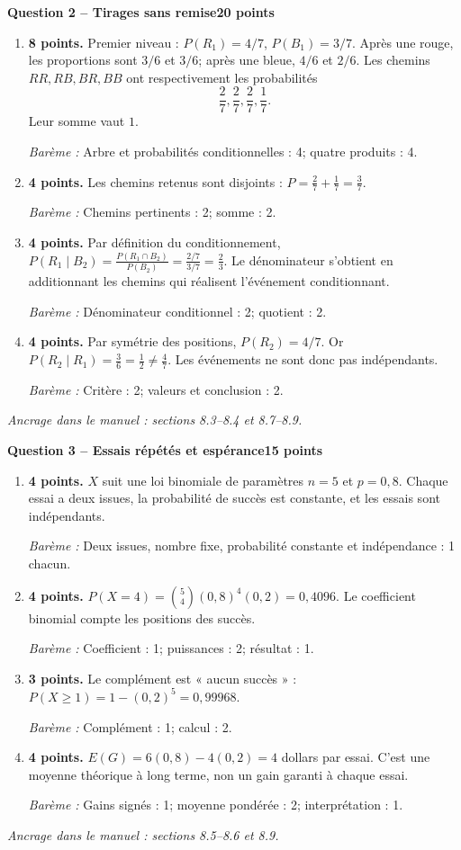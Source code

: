 \documentclass[11pt,a4paper]{article}
\begin{document}
\newpage
{\large\bfseries Question 2 -- Tirages sans remise}\hfill\textbf{20 points}\par
\begin{enumerate}
\item \textbf{8 points.} Premier niveau : \(P(R_1)=4/7\), \(P(B_1)=3/7\). Après une rouge, les proportions sont \(3/6\) et \(3/6\); après une bleue, \(4/6\) et \(2/6\). Les chemins \(RR,RB,BR,BB\) ont respectivement les probabilités \[\frac27,\frac27,\frac27,\frac17.\] Leur somme vaut \(1\).
\par{\small\textit{Barème : }Arbre et probabilités conditionnelles : 4; quatre produits : 4.}
\item \textbf{4 points.} Les chemins retenus sont disjoints : \(P=\frac27+\frac17=\frac37\).
\par{\small\textit{Barème : }Chemins pertinents : 2; somme : 2.}
\item \textbf{4 points.} Par définition du conditionnement, \(P(R_1\mid B_2)=\frac{P(R_1\cap B_2)}{P(B_2)}=\frac{2/7}{3/7}=\frac23\). Le dénominateur s’obtient en additionnant les chemins qui réalisent l’événement conditionnant.
\par{\small\textit{Barème : }Dénominateur conditionnel : 2; quotient : 2.}
\item \textbf{4 points.} Par symétrie des positions, \(P(R_2)=4/7\). Or \(P(R_2\mid R_1)=\frac36=\frac12\ne\frac47\). Les événements ne sont donc pas indépendants.
\par{\small\textit{Barème : }Critère : 2; valeurs et conclusion : 2.}
\end{enumerate}
\vfill {\small\textit{Ancrage dans le manuel : sections 8.3--8.4 et 8.7--8.9.}}

\newpage
{\large\bfseries Question 3 -- Essais répétés et espérance}\hfill\textbf{15 points}\par
\begin{enumerate}
\item \textbf{4 points.} \(X\) suit une loi binomiale de paramètres \(n=5\) et \(p=0{,}8\). Chaque essai a deux issues, la probabilité de succès est constante, et les essais sont indépendants.
\par{\small\textit{Barème : }Deux issues, nombre fixe, probabilité constante et indépendance : 1 chacun.}
\item \textbf{4 points.} \(P(X=4)=\binom54(0{,}8)^4(0{,}2)=0{,}4096\). Le coefficient binomial compte les positions des succès.
\par{\small\textit{Barème : }Coefficient : 1; puissances : 2; résultat : 1.}
\item \textbf{3 points.} Le complément est « aucun succès » : \(P(X\ge1)=1-(0{,}2)^5=0{,}99968\).
\par{\small\textit{Barème : }Complément : 1; calcul : 2.}
\item \textbf{4 points.} \(E(G)=6(0{,}8)-4(0{,}2)=4\) dollars par essai. C’est une moyenne théorique à long terme, non un gain garanti à chaque essai.
\par{\small\textit{Barème : }Gains signés : 1; moyenne pondérée : 2; interprétation : 1.}
\end{enumerate}
\vfill {\small\textit{Ancrage dans le manuel : sections 8.5--8.6 et 8.9.}}
\end{document}
